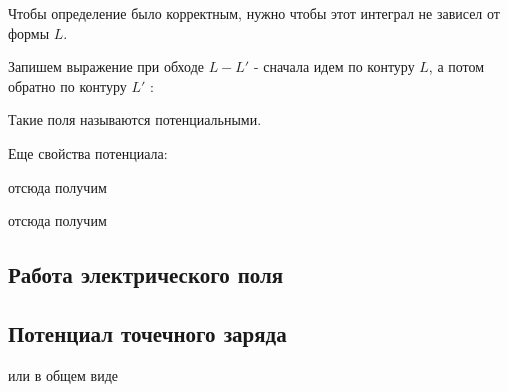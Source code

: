 Чтобы определение было корректным, нужно чтобы этот интеграл не зависел от
формы $L$.



Запишем выражение при обходе $L-L'$ - сначала идем по контуру $L$, а
потом обратно по контуру $L'$ : 


Такие поля называются потенциальными.


Еще свойства потенциала: 

   


 
отсюда получим




отсюда получим



\subsection*{Работа электрического поля}


\subsection*{Потенциал точечного заряда}


или в общем виде


